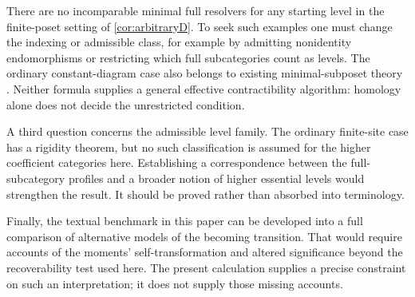 There are no incomparable minimal full resolvers for any starting
level in the finite-poset setting of \cref{cor:arbitraryD}. To seek
such examples one must change the indexing or admissible class, for
example by admitting nonidentity endomorphisms or restricting which
full subcategories count as levels. The ordinary constant-diagram
case also belongs to existing minimal-subposet theory
\cite{DeyLesnick,BrustleEtAl}. Neither formula supplies a general
effective contractibility algorithm: homology alone does not decide
the unrestricted condition.

A third question concerns the admissible level family. The ordinary
finite-site case has a rigidity theorem, but no such classification is
assumed for the higher coefficient categories here. Establishing a
correspondence between the full-subcategory profiles and a broader
notion of higher essential levels would strengthen the result. It
should be proved rather than absorbed into terminology.

Finally, the textual benchmark in this paper can be developed into a
full comparison of alternative models of the becoming transition. That
would require accounts of the moments' self-transformation and altered
significance beyond the recoverability test used here. The present
calculation supplies a precise constraint on such an interpretation; it
does not supply those missing accounts.
